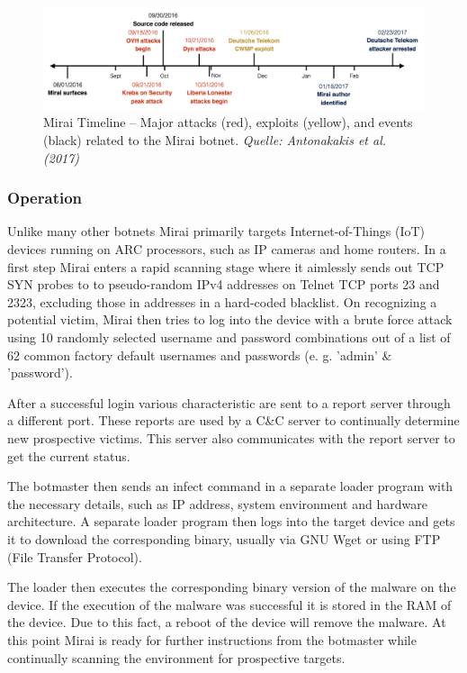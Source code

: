 	
\begin{figure}[ht]
\begin{center} \includegraphics[scale=0.35]{Talk11/mirai-timeline} \end{center}
\caption{Mirai Timeline -- Major attacks (red), exploits (yellow), and events (black) related to the Mirai botnet. \textit{Quelle: Antonakakis et al. (2017)}}
\label{fig:timeline}
\end{figure}

\subsubsection{Operation}
		Unlike many other botnets Mirai primarily targets Internet-of-Things (IoT) devices running on ARC processors, such as IP cameras and home routers. In a first step Mirai enters a rapid scanning stage where it aimlessly sends out TCP SYN probes to to pseudo-random IPv4 addresses on Telnet TCP ports 23 and 2323, excluding those in addresses in a hard-coded blacklist. \cite{Kolias17} On recognizing a potential victim, Mirai then tries to log into the device with a brute force attack using 10 randomly selected username and password combinations out of a list of 62 common factory default usernames and passwords (e. g. 'admin' \& 'password'). \cite{Antonakakis17}
		
After a successful login various characteristic are sent to a report server through a different port. These reports are used by a C\&C server to continually determine new prospective victims. This server also communicates with the report server to get the current status. \cite{Kolias17}

The botmaster then sends an infect command in a separate loader program with the necessary details, such as IP address, system environment and hardware architecture. A separate loader program then logs into the target device and gets it to download the corresponding binary, usually via GNU Wget or using FTP (File Transfer Protocol). \cite{Kolias17}

The loader then executes the corresponding binary version of the malware on the device. If the execution of the malware was successful it is stored in the RAM of the device. Due to this fact, a reboot of the device will remove the malware. At this point Mirai is ready for further instructions from the botmaster while continually scanning the environment for prospective targets. \cite{Kolias17}

